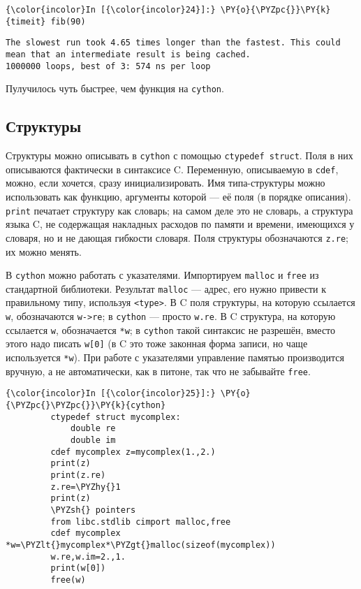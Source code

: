     \begin{Verbatim}[commandchars=\\\{\}]
{\color{incolor}In [{\color{incolor}24}]:} \PY{o}{\PYZpc{}}\PY{k}{timeit} fib(90)
\end{Verbatim}

    \begin{Verbatim}[commandchars=\\\{\}]
The slowest run took 4.65 times longer than the fastest. This could mean that an intermediate result is being cached.
1000000 loops, best of 3: 574 ns per loop

    \end{Verbatim}

    Пулучилось чуть быстрее, чем функция на \texttt{cython}.

\subsection{Структуры}
\label{cython4}

Структуры можно описывать в \texttt{cython} с помощью
\texttt{ctypedef\ struct}. Поля в них описываются фактически в
синтаксисе C. Переменную, описываемую в \texttt{cdef}, можно, если
хочется, сразу инициализировать. Имя типа-структуры можно использовать
как функцию, аргументы которой --- её поля (в порядке описания).
\texttt{print} печатает структуру как словарь; на самом деле это не
словарь, а структура языка C, не содержащая накладных расходов по памяти
и времени, имеющихся у словаря, но и не дающая гибкости словаря. Поля
структуры обозначаются \texttt{z.re}; их можно менять.

В \texttt{cython} можно работать с указателями. Импортируем
\texttt{malloc} и \texttt{free} из стандартной библиотеки. Результат
\texttt{malloc} --- адрес, его нужно привести к правильному типу,
используя \texttt{\textless{}type\textgreater{}}. В C поля структуры, на
которую ссылается \texttt{w}, обозначаются \texttt{w-\textgreater{}re};
в \texttt{cython} --- просто \texttt{w.re}. В C структура, на которую
ссылается \texttt{w}, обозначается \texttt{*w}; в \texttt{cython} такой
синтаксис не разрешён, вместо этого надо писать \texttt{w{[}0{]}} (в C
это тоже законная форма записи, но чаще используется \texttt{*w}). При
работе с указателями управление памятью производится вручную, а не
автоматически, как в питоне, так что не забывайте \texttt{free}.

    \begin{Verbatim}[commandchars=\\\{\}]
{\color{incolor}In [{\color{incolor}25}]:} \PY{o}{\PYZpc{}\PYZpc{}}\PY{k}{cython}
         ctypedef struct mycomplex:
             double re
             double im
         cdef mycomplex z=mycomplex(1.,2.)
         print(z)
         print(z.re)
         z.re=\PYZhy{}1
         print(z)
         \PYZsh{} pointers
         from libc.stdlib cimport malloc,free
         cdef mycomplex *w=\PYZlt{}mycomplex*\PYZgt{}malloc(sizeof(mycomplex))
         w.re,w.im=2.,1.
         print(w[0])
         free(w)
\end{Verbatim}

